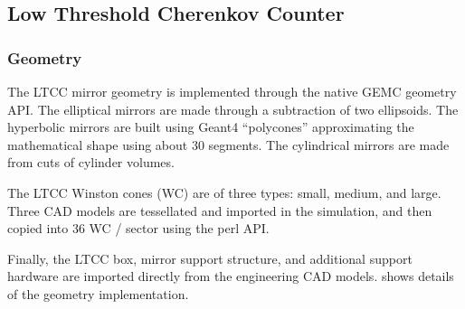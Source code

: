 \subsection{Low Threshold Cherenkov Counter}

\subsubsection{Geometry}
The LTCC mirror geometry is implemented through the native GEMC geometry API. The elliptical mirrors are made through a subtraction of
two ellipsoids. The hyperbolic mirrors are built using Geant4 ``polycones'' approximating the mathematical shape using about 30 segments.
The cylindrical mirrors are made from cuts of cylinder volumes.

The LTCC Winston cones (WC) are of three types: small, medium, and large. Three CAD models are tessellated and imported in the simulation, and
then copied into 36 WC / sector using the perl API.

Finally, the LTCC box, mirror support structure, and additional support hardware are imported directly from the engineering CAD models.
 shows details of the geometry implementation.

